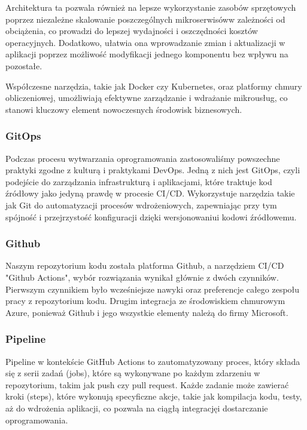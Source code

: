 Architektura ta pozwala również na lepsze wykorzystanie zasobów sprzętowych poprzez niezależne skalowanie poszczególnych mikroserwisów\linebreak w zależności od obciążenia, co prowadzi do lepszej wydajności i oszczędności kosztów operacyjnych. Dodatkowo, ułatwia ona wprowadzanie zmian \linebreak i aktualizacji w aplikacji poprzez możliwość modyfikacji jednego komponentu bez wpływu na pozostałe.

Współczesne narzędzia, takie jak Docker czy Kubernetes, oraz platformy chmury obliczeniowej, umożliwiają efektywne zarządzanie i wdrażanie mikrousług, co stanowi kluczowy element nowoczesnych środowisk biznesowych.

\subsubsection{GitOps}
Podczas procesu wytwarzania oprogramowania zastosowaliśmy powszechne praktyki zgodne z kulturą i praktykami DevOps. Jedną z nich jest GitOps, czyli podejście do zarządzania infrastrukturą i aplikacjami, które traktuje kod źródłowy jako jedyną prawdę w procesie CI/CD. Wykorzystuje narzędzia takie jak Git do automatyzacji procesów wdrożeniowych, zapewniając przy tym spójność i przejrzystość konfiguracji dzięki wersjonowaniu\linebreak i kodowi źródłowemu.

\subsubsection{Github}
Naszym repozytorium kodu została platforma Github, a narzędziem CI/CD "Github Actions", wybór rozwiązania wynikał głównie z dwóch czynników. Pierwszym czynnikiem było wcześniejsze nawyki oraz preferencje całego zespołu pracy z repozytorium kodu. Drugim integracja ze środowiskiem chmurowym Azure, ponieważ Github i jego wszystkie elementy należą do firmy Microsoft.

\subsubsection{Pipeline}
Pipeline w kontekście GitHub Actions to zautomatyzowany proces, który składa się z serii zadań (jobs), które są wykonywane po każdym zdarzeniu w repozytorium, takim jak push czy pull request. Każde zadanie może zawierać kroki (steps), które wykonują specyficzne akcje, takie jak kompilacja kodu, testy, aż do wdrożenia aplikacji, co pozwala na ciągłą integrację\linebreak i dostarczanie oprogramowania.

